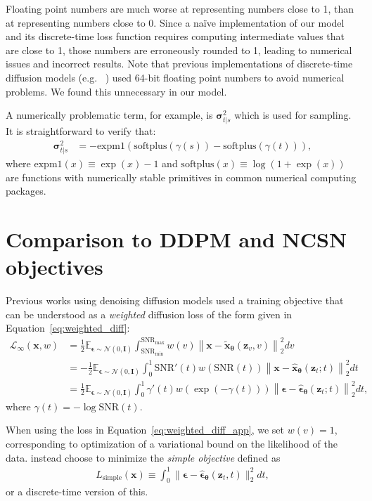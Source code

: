 \documentclass{article}
\def\Eqref#1{Equation~\ref{#1}}
\def\rvx{{\mathbf{x}}}
\def\rvz{{\mathbf{z}}}
\newcommand{\E}{\mathbb{E}}
\newcommand{\bT}{{\boldsymbol{\theta}}}
\newcommand{\bfI}{\mathbf{I}}
\newcommand{\bepsilon}{{\boldsymbol{\epsilon}}}
\newcommand{\bsigma}{{\boldsymbol{\sigma}}}
\newcommand{\bsst}{\bsigma_{t|s}}
\newcommand{\snr}{\text{SNR}}
\begin{document}
Floating point numbers are much worse at representing numbers close to 1, than at representing numbers close to 0. Since a na\"ive implementation of our model and its discrete-time loss function requires computing intermediate values that are close to 1, those numbers are erroneously rounded to 1, leading to numerical issues and incorrect results. Note that previous implementations of discrete-time diffusion models (e.g. ~\citep{ho2020denoising}) used 64-bit floating point numbers to avoid numerical problems. We found this unnecessary in our model.

A numerically problematic term, for example, is $\bsst^2$ which is used for sampling. It is straightforward to verify that:
\begin{align}
\bsst^2 &= -\text{expm1}(\text{softplus}(\gamma(s))-\text{softplus}(\gamma(t))),
\end{align}
where $\text{expm1}(x) \equiv \exp(x) - 1$ and $\text{softplus}(x) \equiv \log(1 + \exp(x))$ are functions with numerically stable primitives in common numerical computing packages. 

\section{Comparison to DDPM and NCSN objectives}
\label{sec:ncsn_ddpm_weights}
Previous works using denoising diffusion models \citep{ho2020denoising, song2019generative, nichol2021improved} used a training objective that can be understood as a \emph{weighted} diffusion loss of the form given in \Eqref{eq:weighted_diff}:
\begin{align}
\mathcal{L}_{\infty}(\rvx, w) &= \frac{1}{2}\E_{\bepsilon\sim\mathcal{N}(0,\bfI)} \int_{\snr_{\text{min}}}^{\snr_{\text{max}}} w(v) \left\rVert \rvx - \tilde{\rvx}_{\bT}(\rvz_v, v) \right\lVert_{2}^{2} dv \label{eq:weighted_diff_app}\\
&= -\frac{1}{2}\E_{\bepsilon\sim\mathcal{N}(0,\bfI)} \int_{0}^{1} \snr'(t)w(\snr(t)) \left\rVert \rvx - \hat{\rvx}_{\bT}(\rvz_t;t) \right\lVert_{2}^{2} dt\\
&= \frac{1}{2}\E_{\bepsilon\sim\mathcal{N}(0,\bfI)} \int_{0}^{1} \gamma'(t)w(\exp(-\gamma(t))) \left\rVert \bepsilon - \hat{\bepsilon}_{\bT}(\rvz_t;t) \right\lVert_{2}^{2} dt,\label{eq:weighted_gamma_loss}
\end{align}
where $\gamma(t)=-\log\snr(t)$.

When using the loss in \Eqref{eq:weighted_diff_app}, we set $w(v)=1$, corresponding to optimization of a variational bound on the likelihood of the data. \cite{ho2020denoising, song2019generative,nichol2021improved} instead choose to minimize the \emph{simple objective} defined as
\begin{align}
L_{\text{simple}}(\rvx) \equiv \int_{0}^{1} \lVert \bepsilon - \hat{\bepsilon}_{\bT}(\rvz_{t}, t)\rVert_{2}^{2} dt,
\label{eq:simple_loss}
\end{align}
or a discrete-time version of this.
\end{document}
